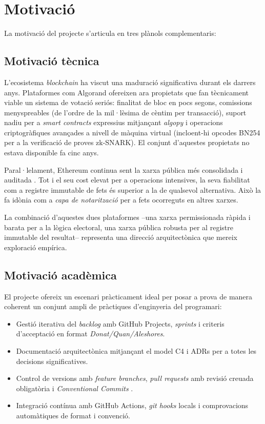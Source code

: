 \section{Motivació}
\label{sec:motivacio}

La motivació del projecte s'articula en tres plànols complementaris:

\subsection{Motivació tècnica}

L'ecosistema \emph{blockchain} ha viscut una maduració significativa
durant els darrers anys. Plataformes com Algorand \cite{chen2017algorand}
ofereixen ara propietats que fan tècnicament viable un sistema de
votació seriós: finalitat de bloc en pocs segons, comissions
menyspreables (de l'ordre de la mil·lèsima de cèntim per transacció), suport
nadiu per a \emph{smart contracts} expressius mitjançant
\emph{algopy} \cite{algorandfoundation2024puya} i operacions
criptogràfiques avançades a nivell de màquina virtual (incloent-hi
opcodes BN254 per a la verificació de proves zk-SNARK). El conjunt
d'aquestes propietats no estava disponible fa cinc anys.

Paral·lelament, Ethereum continua sent la xarxa pública més consolidada
i auditada \cite{buterin2014ethereum}. Tot i el seu cost elevat per a
operacions intensives, la seva fiabilitat com a registre immutable de
fets és superior a la de qualsevol alternativa. Això la fa idònia com a
\emph{capa de notarització} per a fets ocorreguts en altres xarxes.

La combinació d'aquestes dues plataformes --una xarxa permissionada
ràpida i barata per a la lògica electoral, una xarxa pública robusta
per al registre immutable del resultat-- representa una direcció
arquitectònica que mereix exploració empírica.

\subsection{Motivació acadèmica}

El projecte ofereix un escenari pràcticament ideal per posar a prova
de manera coherent un conjunt ampli de pràctiques d'enginyeria del
programari:

\begin{itemize}
    \item Gestió iterativa del \emph{backlog} amb GitHub Projects,
    \emph{sprints} \cite{schwaber2020scrum} i criteris d'acceptació
    en format \emph{Donat/Quan/Aleshores}.
    \item Documentació arquitectònica mitjançant el model C4
    \cite{brown2018c4} i \acp{ADR} per a totes les decisions
    significatives.
    \item Control de versions amb \emph{feature branches}, \emph{pull
    requests} amb revisió creuada obligatòria i \emph{Conventional
    Commits} \cite{conventionalcommits}.
    \item Integració contínua amb GitHub Actions, \emph{git hooks}
    locals i comprovacions automàtiques de format i convenció.
\end{itemize}

